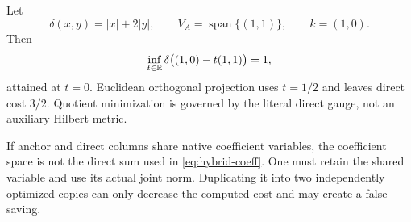 \begin{example}
Let
\[
 \delta(x,y)=|x|+2|y|,
 \qquad
 V_A=\operatorname{span}\{(1,1)\},
 \qquad
 k=(1,0).
\]
Then
\[
 \inf_{t\in\mathbb R}\delta\bigl((1,0)-t(1,1)\bigr)=1,
\]
attained at \(t=0\).  Euclidean orthogonal projection uses
\(t=1/2\) and leaves direct cost \(3/2\).  Quotient minimization is
governed by the literal direct gauge, not an auxiliary Hilbert metric.
\end{example}

\begin{remark}
If anchor and direct columns share native coefficient variables, the
coefficient space is not the direct sum used in
\eqref{eq:hybrid-coeff}.  One must retain the shared variable and use
its actual joint norm.  Duplicating it into two independently optimized
copies can only decrease the computed cost and may create a false
saving.
\end{remark}
